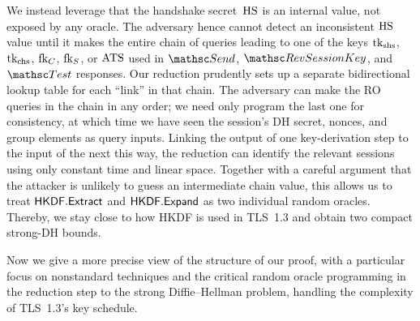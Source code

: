 We instead leverage that the handshake secret~$\mathrm{HS}$ is an internal value, not exposed by any oracle.
The adversary hence cannot detect an inconsistent $\mathrm{HS}$ value until it makes the entire chain of queries leading to one of the keys $\mathrm{tk}_{\text{shs}}$, $\mathrm{tk}_{\text{chs}}$, $\mathrm{fk}_C$, $\mathrm{fk}_S$, or $\mathrm{ATS}$ used in $\Send$, $\RevSessionKey$, and $\Test$ responses.
Our reduction prudently sets up a separate bidirectional lookup table for each ``link'' in that chain.
The adversary can make the RO queries in the chain in any order; we need only program the last one for consistency, at which time we have seen the session's DH secret, nonces, and group elements as query inputs.
Linking the output of one key-derivation step to the input of the next this way, the reduction can identify the relevant sessions using only constant time and linear space.
Together with a careful argument that the attacker is unlikely to guess an intermediate chain value, this allows us to treat $\mathsf{HKDF}.\mathsf{Extract}$ and $\mathsf{HKDF}.\mathsf{Expand}$ as two individual random oracles.
Thereby, we stay close to how HKDF is used in TLS~1.3 and obtain two compact strong-DH bounds.
%

\bigskip

Now we give a more precise view of the structure of our proof, with a particular focus on nonstandard techniques %
and the critical random oracle programming in the reduction step to the strong Diffie--Hellman problem, handling the complexity of TLS~1.3's key schedule.

